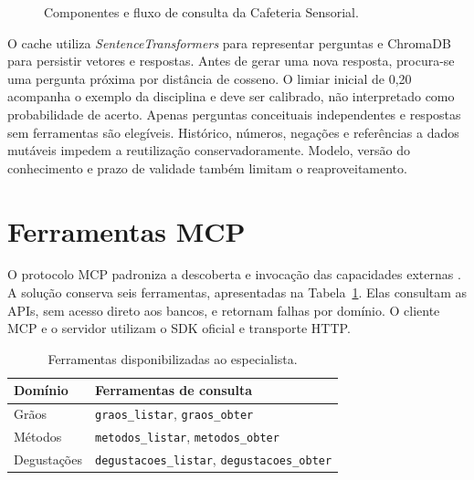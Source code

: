 \begin{figure}[htbp]
\centering
{}
\caption{Componentes e fluxo de consulta da Cafeteria Sensorial.}
\label{fig:cafe-arquitetura}
\end{figure}

O cache utiliza \textit{SentenceTransformers} para representar perguntas e ChromaDB para persistir vetores e respostas. Antes de gerar uma nova resposta, procura-se uma pergunta próxima por distância de cosseno. O limiar inicial de 0,20 acompanha o exemplo da disciplina e deve ser calibrado, não interpretado como probabilidade de acerto. Apenas perguntas conceituais independentes e respostas sem ferramentas são elegíveis. Histórico, números, negações e referências a dados mutáveis impedem a reutilização conservadoramente. Modelo, versão do conhecimento e prazo de validade também limitam o reaproveitamento.

\section{Ferramentas MCP}

O protocolo MCP padroniza a descoberta e invocação das capacidades externas \cite{cafe_mcp}. A solução conserva seis ferramentas, apresentadas na Tabela~\ref{tab:cafe-tools}. Elas consultam as APIs, sem acesso direto aos bancos, e retornam falhas por domínio. O cliente MCP e o servidor utilizam o SDK oficial e transporte HTTP.

\begin{table}[htbp]
\centering
\begin{tabular}{ll}
\hline
Domínio & Ferramentas de consulta\\
\hline
Grãos & \texttt{graos\_listar}, \texttt{graos\_obter}\\
Métodos & \texttt{metodos\_listar}, \texttt{metodos\_obter}\\
Degustações & \texttt{degustacoes\_listar}, \texttt{degustacoes\_obter}\\
\hline
\end{tabular}
\caption{Ferramentas disponibilizadas ao especialista.}
\label{tab:cafe-tools}
\end{table}

